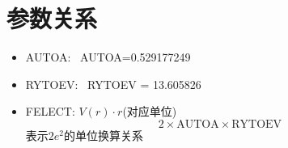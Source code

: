 


\section{参数关系}
\begin{itemize}
	\item \textrm{AUTOA}:~ \textrm{AUTOA}=0.529177249
	\item \textrm{RYTOEV}:~ \textrm{RYTOEV} = 13.605826
	\item \textrm{FELECT}: $V(r)\cdot r$(对应单位)
		\begin{displaymath}
			2\times\textrm{AUTOA}\times\textrm{RYTOEV}
		\end{displaymath}
		表示$2e^2$的单位换算关系
\end{itemize}
